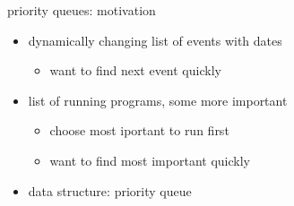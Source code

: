 \begin{frame}{priority queues: motivation}
\begin{itemize}
\item dynamically changing list of events with dates
    \begin{itemize}
    \item want to find next event quickly
    \end{itemize}
\item list of running programs, some more important
    \begin{itemize}
    \item choose most iportant to run first
    \item want to find most important quickly
    \end{itemize}
\vspace{.5cm}
\item data structure: priority queue
\end{itemize}
\end{frame}
